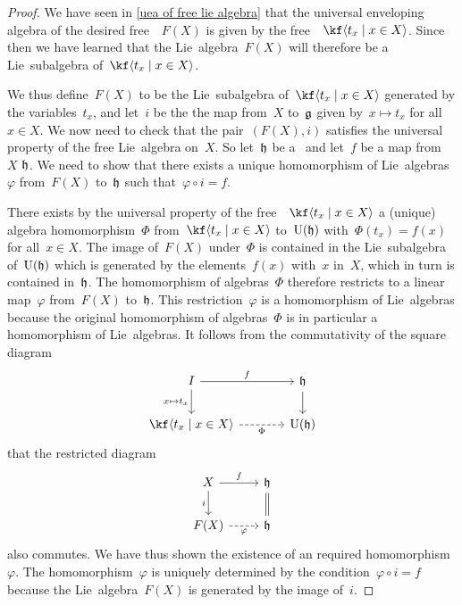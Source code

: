 \begin{proof}
  We have seen in \cref{uea of free lie algebra} that the universal enveloping algebra of the desired free~\liealgebra{$\kf$}~$F(X)$ is given by the free~{\algebra{$\kf$}}~$\kf\gen{t_x \suchthat x \in X}$.
  Since then we have learned that the Lie~algebra~$F(X)$ will therefore be a Lie~subalgebra of~$\kf\gen{t_x \suchthat x \in X}$.

  We thus define~$F(X)$ to be the Lie~subalgebra of~$\kf\gen{t_x \suchthat x \in X}$ generated by the variables~$t_x$, and let~$i$ be the the map from~$X$ to~$\mathfrak{g}$ given by~$x \mapsto t_x$ for all~$x \in X$.
  We now need to check that the pair~$(F(X), i)$ satisfies the universal property of the free Lie~algebra on~$X$.
  So let~$\mathfrak{h}$ be a~\liealgebra{$\kf$} and let~$f$ be a map from~$X$ $\mathfrak{h}$.
  We need to show that there exists a unique homomorphism of Lie~algebras~$\varphi$ from~$F(X)$ to~$\mathfrak{h}$ such that~$\varphi \circ i = f$.

  There exists by the universal property of the free~\algebra{$\kf$}~$\kf\gen{t_x \suchthat x \in X}$ a (unique) algebra homomorphism~$\Phi$ from~$\kf\gen{t_x \suchthat x \in X}$ to~$\operatorname{U}(\mathfrak{h})$ with~$\Phi(t_x) = f(x)$ for all~$x \in X$.
  The image of~$F(X)$ under~$\Phi$ is contained in the Lie~subalgebra of~$\operatorname{U}(\mathfrak{h})$ which is generated by the elements~$f(x)$ with~$x$ in~$X$, which in turn is contained in~$\mathfrak{h}$.
  The homomorphism of algebras~$\Phi$ therefore restricts to a linear map~$\varphi$ from~$F(X)$ to~$\mathfrak{h}$.
  This restriction~$\varphi$ is a homomorphism of Lie~algebras because the original homomorphism of algebras~$\Phi$ is in particular a homomorphism of Lie~algebras.
  It follows from the commutativity of the square diagram
  \[
    \begin{tikzcd}[column sep = large]
      I
      \arrow{r}[above]{f}
      \arrow{d}[left]{x \mapsto t_x}
      &
      \hlie
      \arrow{d}
      \\
      \kf\gen{t_x \suchthat x \in X}
      \arrow[dashed]{r}[below]{\Phi}
      &
      \Univ(\hlie)
    \end{tikzcd}
  \]
  that the restricted diagram
  \[
    \begin{tikzcd}
      X
      \arrow{r}[above]{f}
      \arrow{d}[left]{i}
      &
      \hlie
      \arrow[equal]{d}
      \\
      F(X)
      \arrow[dashed]{r}[below]{\varphi}
      &
      \hlie
    \end{tikzcd}
  \]
  also commutes.
  We have thus shown the existence of an required homomorphism~$\varphi$.
  The homomorphism~$\varphi$ is uniquely determined by the condition~$\varphi \circ i = f$ because the Lie~algebra~$F(X)$ is generated by the image of~$i$.
\end{proof}


